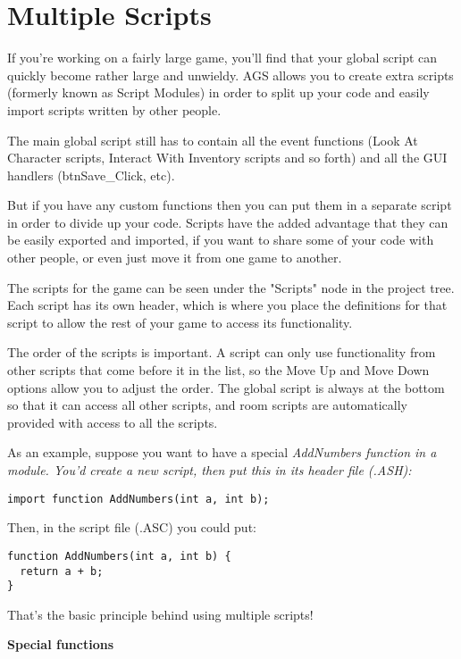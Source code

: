 \section{Multiple Scripts}\label{ScriptModules}%

If you're working on a fairly large game, you'll find that your global script can
quickly become rather large and unwieldy. AGS allows you to create extra scripts
(formerly known as Script Modules) in order to split up your code and easily
import scripts written by other people.

The main global script still has to contain all the event functions (Look At
Character scripts, Interact With Inventory scripts and so forth) and all the GUI
handlers (btnSave_Click, etc).

But if you have any custom functions then you can put them in a separate script in
order to divide up your code. Scripts have the added advantage that they can be
easily exported and imported, if you want to share some of your code with other
people, or even just move it from one game to another.

The scripts for the game can be seen under the "Scripts" node in the project tree. Each
script has its own header, which is where you place the 
definitions for that script to allow the rest of your game to access its functionality.

The order of the scripts is important. A script can only use functionality from other
scripts that come before it in the list, so the Move Up and Move Down options allow you
to adjust the order. The global script is always at the bottom so that it can access all
other scripts, and room scripts are automatically provided with access to all the scripts.

As an example, suppose you want to have a special \it{AddNumbers} function in a module.
You'd create a new script, then put this in its header file (.ASH):
\begin{verbatim}
import function AddNumbers(int a, int b);
\end{verbatim}
Then, in the script file (.ASC) you could put:
\begin{verbatim}
function AddNumbers(int a, int b) {
  return a + b;
}
\end{verbatim}
That's the basic principle behind using multiple scripts!

\bf{Special functions}

